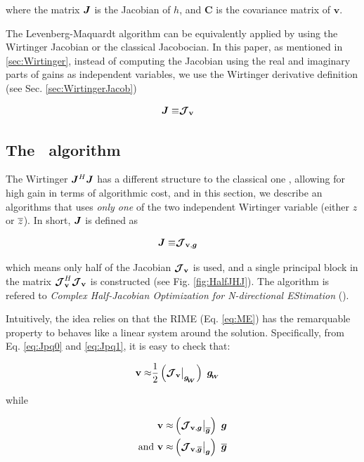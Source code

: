\noindent where the matrix $\bm{J}$ is the Jacobian of $h$, and
$\textbf{C}$ is the covariance matrix of $\mathbf{v}$.

The Levenberg-Maquardt algorithm can be equivalently applied by using the Wirtinger Jacobian
or the classical Jacobocian. In this paper, as mentioned in \ref{sec:Wirtinger}, instead of computing the Jacobian using the real and
imaginary parts of gains as independent variables, we use the Wirtinger
derivative definition (see Sec. \ref{sec:WirtingerJacob})

\begin{alignat}{2}
\label{eq:LMWirtinger}
\bm{J}\equiv&\bm{\mathcal{J}}_{\textbf{v}}
\end{alignat}

\subsection{The \COH~algorithm}


The Wirtinger $\bm{J}^H\bm{J}$ has a different structure to the classical one \citep[][in prep]{SmirnovTasse14}, allowing for high gain
in terms of algorithmic cost, and in this section, we describe an algorithms that uses {\it only one} of the
two independent Wirtinger variable (either $z$ or $\overline{z}$). In
short, $\bm{J}$ is defined as

\begin{alignat}{2}
\label{eq:LMWirtinger}
\bm{J}\equiv&\bm{\mathcal{J}}_{\textbf{v},\bm{g}}
\end{alignat}

\noindent which means only half of the
Jacobian $\bm{\mathcal{J}}_{\textbf{v}}$ is used, and a single principal block in the matrix
$\bm{\mathcal{J}}_{\textbf{v}}^H\bm{\mathcal{J}}_{\textbf{v}}$ is constructed (see Fig. \ref{fig:HalfJHJ}). The algorithm is refered to {\it Complex Half-Jacobian Optimization for
N-directional EStimation} (\COH).

Intuitively, the idea relies on that the RIME (Eq. \ref{eq:ME}) has the remarquable property to
behaves like a linear system around the solution. Specifically, from Eq. \ref{eq:Jpq0} and
\ref{eq:Jpq1}, it is easy to check that:

\begin{alignat}{2}
\label{eq:Lin}
\textbf{v}\approx&\frac{1}{2}\left(\bm{\mathcal{J}}_{\textbf{v}}\big|_{\bm{g_{\!_{W}}}}\right)\ \bm{g_{\!_{W}}}
\end{alignat}

\noindent while

\begin{alignat}{2}
\label{eq:Lin2}
\textbf{v}\approx&\left(\bm{\mathcal{J}}_{\textbf{v},\bm{g}}\big|_{\overline{\bm{g}}}\right)\ \bm{g}\\
\text{and }\textbf{v}\approx&\left(\bm{\mathcal{J}}_{\textbf{v},\bm{\overline{g}}}\big|_{\bm{g}}\right)\ \overline{\bm{g}}
\end{alignat}

